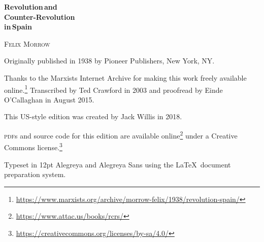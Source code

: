 \begin{titlepage}
	\setlength{\parindent}{0pt}
	
	\vspace*{\fill}
	
	{\sffamily\bfseries\fontsize{40}{40}\selectfont
		Revolution\,\textmd{and} \\
		Counter-Revolution \\
		\textmd{in}\,Spain
		\par}
	
	\vspace{60pt}
	
	{\fontsize{20}{20}\selectfont
		\textsc{Felix Morrow}
		\par}
	
	\vspace*{\fill}
	
\end{titlepage}

{
	\thispagestyle{empty}
	\setlength{\parindent}{0em}
	\setlength{\parskip}{0.5em}
	\sloppy
	
	\vspace*{\fill}
	\vspace*{\fill}
	
	Originally published in 1938 by Pioneer Publishers, New York, NY.
	
	Thanks to the Marxists Internet Archive
	for making this work freely available online.\footnote{\href{https://www.marxists.org/archive/morrow-felix/1938/revolution-spain/}{https://www.marxists.org/archive/morrow-felix/1938/revolution-spain/}}
	Transcribed by Ted Crawford in 2003
	and proofread by Einde O’Callaghan in August 2015.
	
	This US-style edition was created by Jack Willis in 2018.
	
	\textsc{pdf}s and source code for this edition are available online\footnote{\href{https://www.attac.us/books/rcrs/}{https://www.attac.us/books/rcrs/}}
	under a Creative Commons license.\footnote{\href{https://creativecommons.org/licenses/by-sa/4.0/}{https://creativecommons.org/licenses/by-sa/4.0/}}
	
	Typeset in 12pt Alegreya and {\AlegreyaSans Alegreya Sans} using the \LaTeX\ document preparation system.
	
	\vspace*{\fill}
}